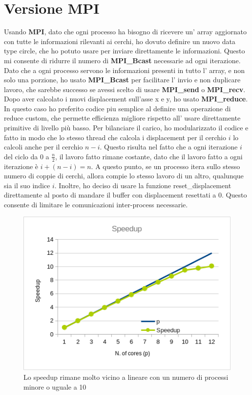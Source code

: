 \documentclass[a4paper,11pt, twoside]{report}
\begin{document}
\section*{Versione MPI}
Usando \textbf{MPI}, dato che ogni processo ha bisogno di ricevere un' array aggiornato con tutte le informazioni rilevanti ai cerchi, 
ho dovuto definire un nuovo data type circle, che ho potuto usare per inviare direttamente le informazioni. 
Questo mi consente di ridurre il numero di \textbf{MPI\_Bcast} necessarie ad ogni iterazione.
Dato che a ogni processo servono le informazioni presenti in tutto l' array, e non solo una porzione, ho usato \textbf{MPI\_Bcast} per facilitare l' invio e non duplicare lavoro,
che sarebbe successo se avessi scelto di usare \textbf{MPI\_send} o  \textbf{MPI\_recv}.
Dopo aver calcolato i nuovi displacement sull'asse x e y, ho usato \textbf{MPI\_reduce}. 
In questo caso ho preferito codice piu semplice al definire una operazione di reduce custom,
che permette efficienza migliore rispetto all' usare direttamente primitive di livello più basso.
Per bilanciare il carico, ho modularizzato il codice e fatto in modo che lo stesso thread che calcola i displacement per il cerchio $i$ lo calcoli anche per il cerchio $n-i$.
Questo risulta nel fatto che a ogni iterazione $i$ del ciclo da $0$ a $\frac{n}{2}$, il lavoro fatto rimane costante, dato che il lavoro fatto a ogni iterazione è $i + (n-i) = n$.
A questo punto, se un processo itera sullo stesso numero di coppie di cerchi, allora compie lo stesso lavoro di un altro, qualunque sia il suo indice $i$.
Inoltre, ho deciso di usare la funzione reset\_displacement direttamente al posto di mandare il buffer con displacement resettati a 0.
Questo consente di limitare le comunicazioni inter-process necessarie.
\begin{figure}
    \includegraphics[scale=0.5]{images/mpi_speedup.png}
    \caption[]{Lo speedup rimane molto vicino a lineare con un numero di processi minore o uguale a 10}
\end{figure}
\end{document}
